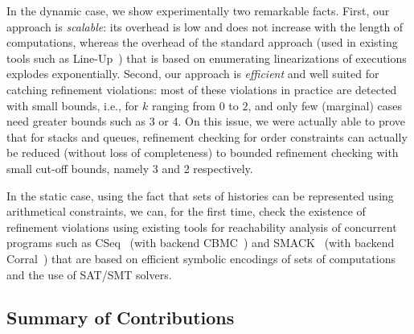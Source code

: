 In the dynamic case, we show experimentally two remarkable facts. First, our
approach is \emph{scalable}: its overhead is low and does not increase with the
length of computations, whereas the overhead of the standard approach (used in
existing tools such as Line-Up~\cite{conf/pldi/BurckhardtDMT10}) that is based on enumerating
linearizations of executions explodes exponentially. Second, our approach is
\emph{efficient} and well suited for catching refinement violations: most of
these violations in practice are detected with small bounds, i.e., for $k$
ranging from 0 to $2$, and only few (marginal) cases need greater bounds such
as 3 or 4. On this issue, we were actually able to prove that for 
stacks and queues, refinement checking for order constraints
can actually be reduced (without loss of completeness) to bounded refinement
checking with small cut-off bounds, namely 3 and 2 respectively.

In the static case, using the fact that sets of histories can be represented
using arithmetical constraints, we can, for the first time, check the existence
of refinement violations using existing tools for reachability analysis of
concurrent programs such as CSeq~\cite{conf/ase/FischerIP13} (with backend CBMC~\cite{conf/tacas/KroeningT14}) and SMACK~\cite{conf/cav/RakamaricE14} (with backend Corral~\cite{conf/cav/LalQL12}) that are based on efficient symbolic
encodings of sets of computations and the use of SAT/SMT solvers.


\subsection{Summary of Contributions}

